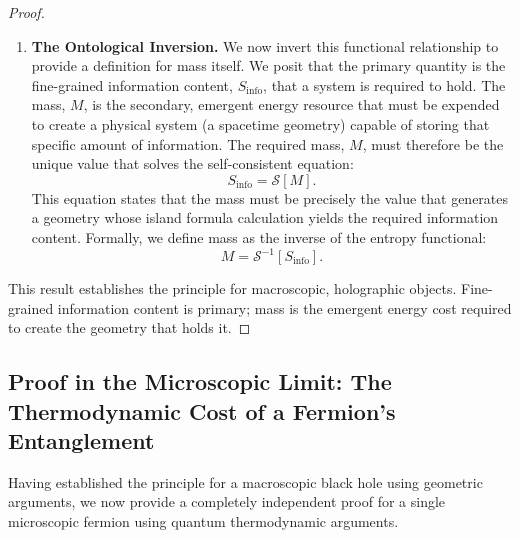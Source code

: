 \documentclass[11pt, letterpaper]{report}
\theoremstyle{plain} %
\theoremstyle{definition} %
\theoremstyle{remark} %
\begin{document}
\begin{proof}
\begin{enumerate}
    \item \textbf{The Ontological Inversion.} We now invert this functional relationship to provide a definition for mass itself. We posit that the primary quantity is the fine-grained information content, $S_{\text{info}}$, that a system is required to hold. The mass, $M$, is the secondary, emergent energy resource that must be expended to create a physical system (a spacetime geometry) capable of storing that specific amount of information. The required mass, $M$, must therefore be the unique value that solves the self-consistent equation:
    \begin{equation}
        S_{\text{info}} = \mathcal{S}[M].
    \end{equation}
    This equation states that the mass must be precisely the value that generates a geometry whose island formula calculation yields the required information content. Formally, we define mass as the inverse of the entropy functional:
    \begin{equation}
        M = \mathcal{S}^{-1}[S_{\text{info}}].
    \end{equation}
\end{enumerate}
This result establishes the principle for macroscopic, holographic objects. Fine-grained information content is primary; mass is the emergent energy cost required to create the geometry that holds it.
\end{proof}

\subsection{Proof in the Microscopic Limit: The Thermodynamic Cost of a Fermion's Entanglement}
\label{subsec:mass_info_particles}

Having established the principle for a macroscopic black hole using geometric arguments, we now provide a completely independent proof for a single microscopic fermion using quantum thermodynamic arguments.
\end{document}
